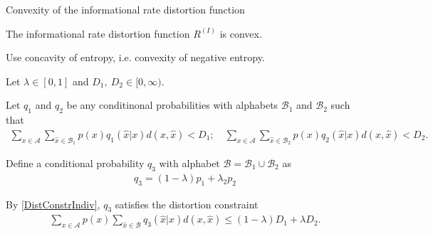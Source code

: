 \begin{frame}{Convexity of the informational rate distortion function}
\begin{proposition}[Convexity of $R^{(I)}$]
The informational rate distortion function $R^{(I)}$ is convex.
\end{proposition}
\vspace{-2.9mm}
\bit
\item {} Use concavity of entropy, i.e. convexity of negative entropy. 
\item Let $\lambda\in [0,1]$ and $D_1,\:D_2\in[0,\infty)$. %
%
%
\item Let $q_1$ and $q_2$ be any conditinonal probabilities with alphabets $\mathcal{B}_1$ and $\mathcal{B}_2$ such that
\begin{align}\label{DistConstrIndiv}
\sum_{x\in\mathcal{A}}\sum_{\hat{x}\in\mathcal{B}_1}p(x)q_1(\hat{x}|x)d(x,\hat{x})<D_1; \quad \sum_{x\in\mathcal{A}}\sum_{\hat{x}\in\mathcal{B}_2}p(x)q_2(\hat{x}|x)d(x,\hat{x})<D_2.
\end{align}

\item Define a conditional probability $q_3$ with alphabet $\mathcal{B}=\mathcal{B}_1\cup\mathcal{B}_2$ as 
\begin{align*}
q_3=(1-\lambda)p_1+\lambda_2 p_2
\end{align*}
\item By \eqref{DistConstrIndiv}, $q_3$ satisfies the distortion constraint
\begin{align}\label{DistConstrQ3}
\sum_{x\in\mathcal{A}}p(x)\sum_{\hat{x}\in\mathcal{B}}q_3(\hat{x}|x)d(x,\hat{x}) \leq (1-\lambda)D_1+\lambda D_2. 
\end{align}
\eit
\end{frame}


